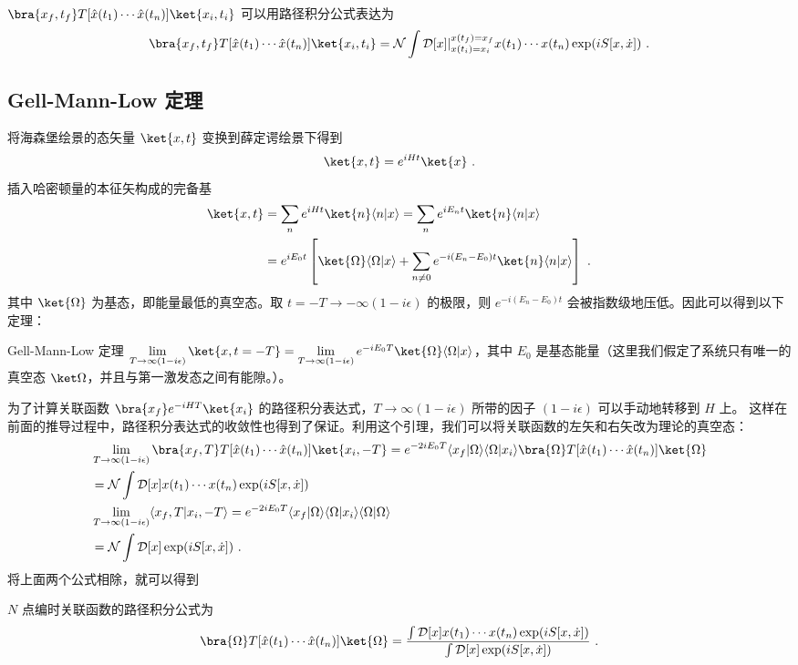 \begin{theorem}{}
$\bra{x_f,t_f} T[\hat x(t_1)\cdots \hat x(t_n)]\ket{x_i,t_i}$ 可以用路径积分公式表达为
\begin{equation}
        \bra{x_f,t_f} T[\hat x(t_1)\cdots \hat x(t_n)]\ket{x_i,t_i}=
        \mathcal{N}\int \mathcal{D}[x]|_{x(t_i)=x_i}^{x(t_f)=x_f} x(t_1)\cdots x(t_n) \exp(i S[x,\dot x])~.
\end{equation}
\end{theorem}

\subsection{Gell-Mann-Low 定理}
将海森堡绘景的态矢量 $\ket{x,t}$ 变换到薛定谔绘景下得到
\begin{equation}
\ket{x,t}=e^{iHt}\ket{x}~.
\end{equation}
插入哈密顿量的本征矢构成的完备基
\begin{equation}
\begin{aligned}
\ket{x,t}&=\sum_n e^{iHt}\ket{n}\langle n|x\rangle=
\sum_n e^{iE_n t}\ket{n}\langle n|x\rangle\\
&=e^{iE_0t}\left[\ket{\Omega}\langle\Omega|x\rangle+\sum_{n\neq 0}e^{-i(E_n-E_0)t}\ket{n}\langle n|x\rangle\right]~.
\end{aligned}
\end{equation}
其中 $\ket{\Omega}$ 为基态，即能量最低的真空态。取 $t=-T\rightarrow -\infty(1-i\epsilon)$ 的极限，则 $e^{-i(E_n-E_0) t}$ 会被指数级地压低。因此可以得到以下定理：
\begin{theorem}{Gell-Mann-Low 定理}
$\lim\limits_{T\rightarrow \infty(1-i\epsilon)}\ket{x,t=-T}=
    \lim\limits_{T\rightarrow \infty(1-i\epsilon)}
    e^{-iE_0T}\ket{\Omega}\langle \Omega|x\rangle$，其中 $E_0$ 是基态能量（这里我们假定了系统只有唯一的真空态 $\ket \Omega$，并且与第一激发态之间有能隙。）。
\end{theorem}
为了计算关联函数 $\bra{x_f}e^{-iHT}\ket{x_i}$ 的路径积分表达式，$T\rightarrow \infty(1-i\epsilon)$ 所带的因子 $(1-i\epsilon)$ 可以手动地转移到 $H$ 上。
这样在前面的推导过程中，路径积分表达式的收敛性也得到了保证。利用这个引理，我们可以将关联函数的左矢和右矢改为理论的真空态：
\begin{equation}
\begin{aligned}
&\lim\limits_{T\rightarrow \infty(1-i\epsilon)}
\bra{x_f,T} T[\hat x(t_1)\cdots \hat x(t_n)]\ket{x_i,-T}=
e^{-2iE_0T}\langle x_f | \Omega \rangle\langle\Omega|x_i\rangle\bra{\Omega} T[\hat x(t_1)\cdots \hat x(t_n)]\ket{\Omega}\\
&=\mathcal{N}\int \mathcal{D}[x] x(t_1)\cdots x(t_n) \exp(i S[x,\dot x])\\
&\lim\limits_{T\rightarrow \infty(1-i\epsilon)}
\langle x_f,T| x_i,-T\rangle=e^{-2iE_0T}\langle x_f | \Omega \rangle\langle\Omega|x_i\rangle\langle\Omega|\Omega\rangle\\
&=\mathcal{N}\int \mathcal{D}[x] \exp(i S[x,\dot x])~.
\end{aligned}
\end{equation}
将上面两个公式相除，就可以得到
\begin{theorem}{}
$N$ 点编时关联函数的路径积分公式为
\begin{equation}
\bra{\Omega} T[\hat x(t_1)\cdots \hat x(t_n)]\ket{\Omega}
=\frac{\int \mathcal{D}[x] x(t_1)\cdots x(t_n) \exp(i S[x,\dot x])}
{\int \mathcal{D}[x]\exp(i S[x,\dot x])}~.
\end{equation}
\end{theorem}
